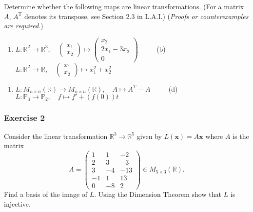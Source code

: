 \documentclass[
  12pt,
  a4paper,
  twoside]{article}
\providecommand{\tightlist}{%
  \setlength{\itemsep}{0pt}\setlength{\parskip}{0pt}}
\theoremstyle{plain}
\theoremstyle{definition}
\begin{document}
Determine whether the following maps are linear transformations. (For a matrix
\(A\), \(A^\mathrm{T}\) denotes its transpose, see Section 2.3 in L.A.I.) (\emph{Proofs or
counterexamples are required.})

\begin{enumerate}
\def\labelenumi{(\alph{enumi})}
\tightlist
\item
  \(L: \mathbb{R}^2 \rightarrow \mathbb{R}^3, \quad \left(\begin{array}{c} x_1 \\ x_2 \end{array}\right) \mapsto \left(\begin{array}{c}x_2\\ 2x_1 - 3x_2 \\ 0\end{array}\right)\) \(\qquad\) (b) \(L: \mathbb{R}^2 \rightarrow \mathbb{R}, \quad \left(\begin{array}{c}x_1 \\ x_2 \end{array}\right) \mapsto x_1^2 + x_2^2\)
\end{enumerate}

\begin{enumerate}
\def\labelenumi{(\alph{enumi})}
\setcounter{enumi}{2}
\tightlist
\item
  \(L: M_{n \times n}(\mathbb{R}) \rightarrow M_{n \times n}(\mathbb{R}), \quad A \mapsto A^\mathrm{T} - A\) \(\qquad\) (d) \(L: \mathbb{P}_3 \rightarrow \mathbb{P}_2, \quad f \mapsto f' + (f(0))t\)
\end{enumerate}

\hypertarget{exercise-2-6}{%
\subsubsection*{Exercise 2}\label{exercise-2-6}}

Consider the linear transformation \(\mathbb{R}^3 \rightarrow \mathbb{R}^5\)
given by \(L(\mathbf{x}) = A\mathbf{x}\) where \(A\) is the matrix
\[A=\left(\begin{array}{ccc} 1 & 1 & -2\\ 2 & 3 & -3 \\ 3& -4 & -13\\ -1 & 1 & 13 \\ 0 & -8 & 2 \end{array}\right) \in M_{5 \times 3}(\mathbb{R}).\]
Find a basis of the image of \(L\). Using the Dimension Theorem show that \(L\) is injective.
\end{document}
